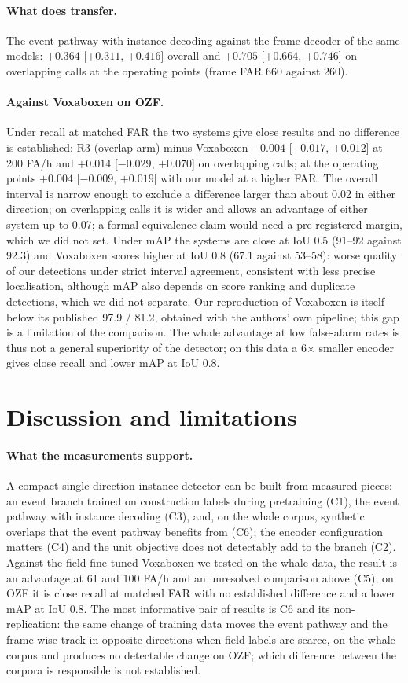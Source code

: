 \documentclass[10pt,twocolumn]{article}
\begin{document}
\paragraph{What does transfer.} The event pathway with instance decoding against the frame decoder of the same models: $+0.364$ [$+0.311$, $+0.416$] overall and $+0.705$ [$+0.664$, $+0.746$] on overlapping calls at the operating points (frame FAR 660 against 260).
\paragraph{Against Voxaboxen on OZF.} Under recall at matched FAR the two systems give close results and no difference is established: R3 (overlap arm) minus Voxaboxen $-0.004$ [$-0.017$, $+0.012$] at 200 FA/h and $+0.014$ [$-0.029$, $+0.070$] on overlapping calls; at the operating points $+0.004$ [$-0.009$, $+0.019$] with our model at a higher FAR. The overall interval is narrow enough to exclude a difference larger than about 0.02 in either direction; on overlapping calls it is wider and allows an advantage of either system up to 0.07; a formal equivalence claim would need a pre-registered margin, which we did not set. Under mAP the systems are close at IoU 0.5 (91--92 against 92.3) and Voxaboxen scores higher at IoU 0.8 (67.1 against 53--58): worse quality of our detections under strict interval agreement, consistent with less precise localisation, although mAP also depends on score ranking and duplicate detections, which we did not separate. Our reproduction of Voxaboxen is itself below its published 97.9 / 81.2, obtained with the authors' own pipeline; this gap is a limitation of the comparison. The whale advantage at low false-alarm rates is thus not a general superiority of the detector; on this data a 6$\times$ smaller encoder gives close recall and lower mAP at IoU 0.8.

\section{Discussion and limitations}
\paragraph{What the measurements support.} A compact single-direction instance detector can be built from measured pieces: an event branch trained on construction labels during pretraining (C1), the event pathway with instance decoding (C3), and, on the whale corpus, synthetic overlaps that the event pathway benefits from (C6); the encoder configuration matters (C4) and the unit objective does not detectably add to the branch (C2). Against the field-fine-tuned Voxaboxen we tested on the whale data, the result is an advantage at 61 and 100 FA/h and an unresolved comparison above (C5); on OZF it is close recall at matched FAR with no established difference and a lower mAP at IoU 0.8. The most informative pair of results is C6 and its non-replication: the same change of training data moves the event pathway and the frame-wise track in opposite directions when field labels are scarce, on the whale corpus and produces no detectable change on OZF; which difference between the corpora is responsible is not established.
\end{document}
